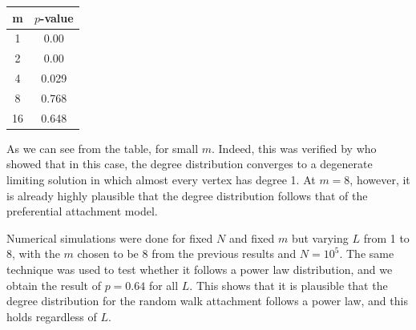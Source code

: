 \begin{center}
\begin{tabular}{ c | c}
m & $p$-value \\
\hline
1 & 0.00 \\
2 & 0.00 \\
4 & 0.029 \\
8 & 0.768 \\
16 & 0.648 \\
\end{tabular}
\label{table:rw-kstest}
\end{center} 

As we can see from the table, for small $m$. Indeed, this was verified by \citet{Cannings2013} who showed that in this case, the degree distribution converges to a degenerate limiting solution in which almost every vertex has degree 1. At $m=8$, however, it is already highly plausible that the degree distribution follows that of the preferential attachment model. 

Numerical simulations were done for fixed $N$ and fixed $m$ but varying $L$ from 1 to 8, with the $m$ chosen to be $8$ from the previous results and $N = 10^5$. The same technique was used to test whether it follows a power law distribution, and we obtain the result of $p = 0.64$ for all $L$. This shows that it is plausible that the degree distribution for the random walk attachment follows a power law, and this holds regardless of $L$. 